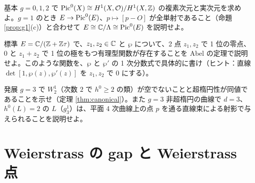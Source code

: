 \begin{prob}{基本}\label{p:pic0dim}
$g=0,1,2$ で $\mathrm{Pic}^0(X)\cong H^1(X,\mathcal O)/H^1(X,\mathbb Z)$ の複素次元と実次元を求めよ。$g=1$ のとき $E\to\mathrm{Pic}^0(E)$、$p\mapsto[p-O]$ が全単射であること（命題 \ref{prop:g1}(c)）と合わせて $E\cong\mathbb C/\Lambda\cong\mathrm{Pic}^0(E)$ を説明せよ。
\end{prob}
\begin{prob}{標準}\label{p:abelell}
$E=\mathbb C/(\mathbb Z+\mathbb Z\tau)$ で、$z_1,z_2\in\mathbb C$ と $\wp$ について、2 点 $z_1,z_2$ で 1 位の零点、$0$ と $z_1+z_2$ で 1 位の極をもつ有理型関数が存在することを Abel の定理で説明せよ。このような関数を、$\wp$ と $\wp'$ の 1 次分数式で具体的に書け（ヒント：直線 $\det[1,\wp(z),\wp'(z)]$ を $z_1,z_2$ で $0$ にする）。
\end{prob}
\begin{prob}{発展}\label{p:BN}
$g=3$ で $W^1_2$（次数 $2$ で $h^0\ge2$ の類）が空でないことと超楕円性が同値であることを示せ（定理 \ref{thm:canonical}）。また $g=3$ 非超楕円の曲線で $d=3$、$h^0(L)=2$ の $L$（$g^1_3$）は、平面 4 次曲線上の点 $p$ を通る直線束による射影で与えられることを説明せよ。
\end{prob}

\section{Weierstrass の gap と Weierstrass 点}\label{sec:weier}

